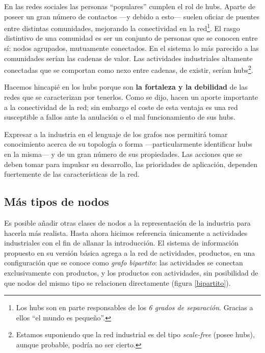 \documentclass[a4paper]{report}
\begin{document}
En las redes sociales las personas ``populares'' cumplen el rol de hubs. Aparte de poseer un gran número de contactos —y debido a esto— suelen oficiar de puentes entre distintas comunidades, mejorando la conectividad en la red\footnote{Los hubs son en parte responsables de los \textit{6 grados de separación}. Gracias a ellos ``el mundo es pequeño''.}. El rasgo distintivo de una comunidad es ser un conjunto de personas que se conocen entre sí: nodos agrupados, mutuamente conectados. En el sistema lo más parecido a las comunidades serían las cadenas de valor. Las actividades industriales altamente conectadas que se comportan como nexo entre cadenas, de existir, serían hubs\footnote{Estamos suponiendo que la red industrial es del tipo \textit{scale-free} (posee hubs), aunque probable, podría no ser cierto.}.

Hacemos hincapié en los hubs porque son \textbf{la fortaleza y la debilidad} de las redes que se caracterizan por tenerlos. Como se dijo, hacen un aporte importante a la conectividad de la red; sin embargo el coste de esta ventaja es una red susceptible a fallos ante la anulación o el mal funcionamiento de sus hubs.

Expresar a la industria en el lenguaje de los grafos nos permitirá tomar conocimiento acerca de su topología o forma —particularmente identificar hubs en la misma— y de un gran número de sus propiedades. Las acciones que se deben tomar para impulsar su desarrollo, las prioridades de aplicación, dependen fuertemente de las características de la red.


\subsection*{Más tipos de nodos}

Es posible añadir otras clases de nodos a la representación de la industria para hacerla más realista. Hasta ahora hicimos referencia únicamente a actividades industriales con el fin de allanar la introducción. El sistema de información propuesto en su versión básica agrega a la red de actividades, productos, en una configuración que se conoce como \textit{grafo bipartito}: las actividades se conectan exclusivamente con productos, y los productos con actividades, sin posibilidad de que nodos del mismo tipo se relacionen directamente (figura \ref{bipartito}).
\end{document}
